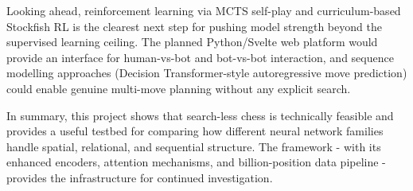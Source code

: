 
Looking ahead, reinforcement learning via MCTS self-play and curriculum-based Stockfish RL is the clearest next step for pushing model strength beyond the supervised learning ceiling. The planned Python/Svelte web platform would provide an interface for human-vs-bot and bot-vs-bot interaction, and sequence modelling approaches (Decision Transformer-style autoregressive move prediction) could enable genuine multi-move planning without any explicit search.

In summary, this project shows that search-less chess is technically feasible and provides a useful testbed for comparing how different neural network families handle spatial, relational, and sequential structure. The framework - with its enhanced encoders, attention mechanisms, and billion-position data pipeline - provides the infrastructure for continued investigation.

